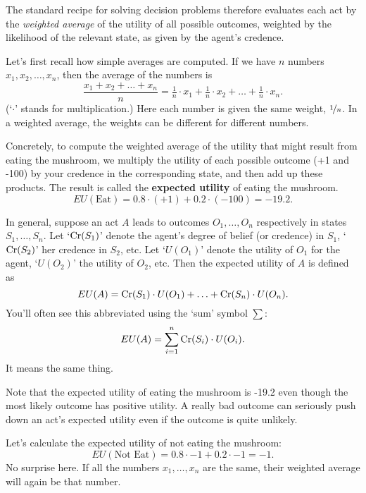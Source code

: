 The standard recipe for solving decision problems therefore evaluates
each act by the \emph{weighted average} of the utility of all possible
outcomes, weighted by the likelihood of the relevant state, as given
by the agent's credence.

Let's first recall how simple averages are computed. If we have $n$
numbers $x_1, x_2, \ldots, x_n$, then the average of the numbers is
\[
\frac{x_1 + x_2 + \ldots + x_n}{n} = \tfrac{1}{n}\cdot x_1 + \tfrac{1}{n}\cdot x_2 + \ldots + \tfrac{1}{n}\cdot x_n.
\]
(`$\cdot$' stands for multiplication.) Here each number is given the
same weight, $\nicefrac{1}{n}$. In a weighted average, the weights can
be different for different numbers.

Concretely, to compute the weighted average of the utility that might
result  from eating the mushroom, we multiply the utility of each
possible outcome (+1 and -100) by your credence in the corresponding
state, and then add up these products. The result is called the
\textbf{expected utility} of eating the mushroom.
\[
EU(\text{Eat}) = 0.8 \cdot (+1) + 0.2 \cdot (-100) = -19.2.
\]

In general, suppose an act $A$ leads to outcomes $O_1,\ldots,O_n$
respectively in states $S_1,\ldots, S_n$. Let `$\text{Cr}(S_1)$' denote the
agent's degree of belief (or credence) in $S_1$, `$\text{Cr}(S_2)$' her
credence in $S_2$, etc. Let `$U(O_1)$' denote the utility of $O_1$ for
the agent, `$U(O_2)$' the utility of $O_2$, etc. Then the expected utility
of $A$ is defined as
\[
EU(A) = \text{Cr}(S_1) \cdot U(O_1) + \ldots + \text{Cr}(S_n) \cdot U(O_n).
\]
You'll often see this abbreviated using the `sum' symbol $\sum$:
\[
EU(A) = \sum_{i=1}^n \text{Cr}(S_i) \cdot U(O_i).
\]
It means the same thing.



Note that the expected utility of eating the mushroom is -19.2 even
though the most likely outcome has positive utility. A really bad
outcome can seriously push down an act's expected utility even if the
outcome is quite unlikely. 

Let's calculate the expected utility of not eating the mushroom:
\[
EU(\text{Not Eat}) = 0.8 \cdot -1 + 0.2 \cdot -1 = -1.
\]
No surprise here. If all the numbers $x_1,\ldots,x_n$ are the same,
their weighted average will again be that number.

